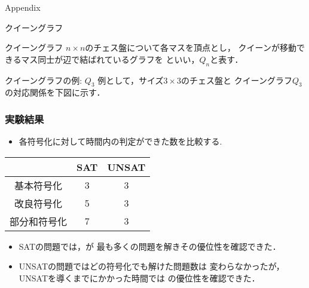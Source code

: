 \appendix
\backupbegin

\begin{frame}{}\Huge
 Appendix
\end{frame}

\begin{frame}{クイーングラフ}
 \begin{block}{クイーングラフ}
  $n\times n$のチェス盤について各マスを頂点とし，
  クイーンが移動できるマス同士が辺で結ばれているグラフを
  といい，$Q_n$と表す．
 \end{block}
 \begin{exampleblock}{クイーングラフの例: $Q_3$}
  例として，サイズ$3 \times 3$のチェス盤と
  クイーングラフ$Q_3$の対応関係を下図に示す．
  \begin{figure}[htb]
   \label{ex:queengraph_3}
   \begin{minipage}[b]{0.2\linewidth}
    \centering
    
   \end{minipage} 
   \begin{minipage}[b]{0.5\linewidth}
    \centering
    
   \end{minipage}
  \end{figure}
 \end{exampleblock}
\end{frame}

\begin{frame}\frametitle{実験結果}
 \begin{itemize}
  \item 各符号化に対して時間内の判定ができた数を比較する.
 \end{itemize}
 \begin{block}{}
  \begin{table}[ht]
   \centering
   \begin{tabular}{c|c|c}
    &SAT &UNSAT \\ \hline
    基本符号化 &3 &3 \\
    改良符号化 &5 &3 \\
    部分和符号化 &{\color{red}7} &3 \\ \hline
   \end{tabular}
  \end{table}
  \begin{itemize}
   \item SATの問題では，が
	 最も多くの問題を解きその優位性を確認できた．
   \item UNSATの問題ではどの符号化でも解けた問題数は
	 変わらなかったが，UNSATを導くまでにかかった時間では
	 の優位性を確認できた．
  \end{itemize}
 \end{block}
\end{frame}

\backupend